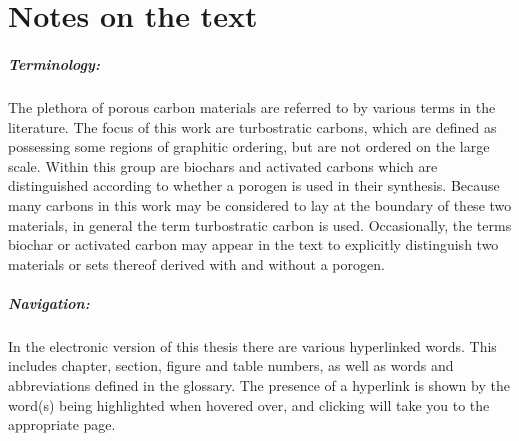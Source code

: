 \cleardoublepage
\chapter*{Notes on the text}

\paragraph{Terminology:} The plethora of porous carbon materials are referred to by various terms in the literature. The focus of this work are \glspl{turbostratic carbon}, which are defined as possessing some regions of graphitic ordering, but are not ordered on the large scale. Within this group are \glspl{biochar} and \glspl{activated carbon} which are distinguished according to whether a \gls{porogen} is used in their synthesis. Because many carbons in this work may be considered to lay at the boundary of these two materials, in general the term \gls{turbostratic carbon} is used. Occasionally, the terms \gls{biochar} or \gls{activated carbon} may appear in the text to explicitly distinguish two materials or sets thereof derived with and without a \gls{porogen}.

\paragraph{Navigation:} In the electronic version of this thesis there are various hyperlinked words. This includes chapter, section, figure and table numbers, as well as words and abbreviations defined in the glossary. The presence of a hyperlink is shown by the word(s) being highlighted when hovered over, and clicking will take you to the appropriate page. 